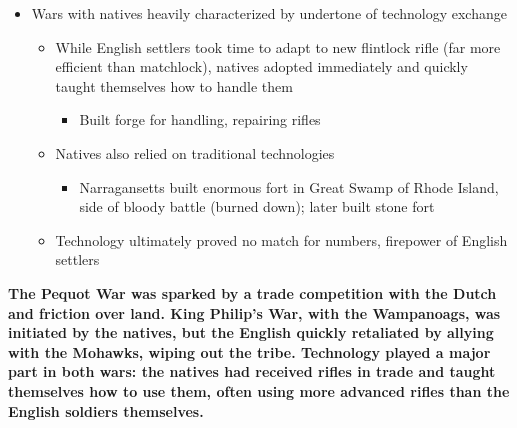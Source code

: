 \documentclass[a4paper]{article}
\begin{document}
{\begin{itemize}
\begin{itemize}
            \item French posed threat by allying with Algonquins, later attacking English
        \end{itemize}
        \item Wars with natives heavily characterized by undertone of technology exchange
        \begin{itemize}
            \item While English settlers took time to adapt to new flintlock rifle (far more efficient than matchlock), natives adopted immediately and quickly taught themselves how to handle them
            \begin{itemize}
                \item Built forge for handling, repairing rifles
            \end{itemize}
            \item Natives also relied on traditional technologies
            \begin{itemize}
                \item Narragansetts built enormous fort in Great Swamp of Rhode Island, side of bloody battle (burned down); later built stone fort
            \end{itemize}
            \item Technology ultimately proved no match for numbers, firepower of English settlers
        \end{itemize}
    \end{itemize}
    \textbf{The Pequot War was sparked by a trade competition with the Dutch and friction over land. King Philip's War, with the Wampanoags, was initiated by the natives, but the English quickly retaliated by allying with the Mohawks, wiping out the tribe. Technology played a major part in both wars: the natives had received rifles in trade and taught themselves how to use them, often using more advanced rifles than the English soldiers themselves.}}
    
\end{document}
